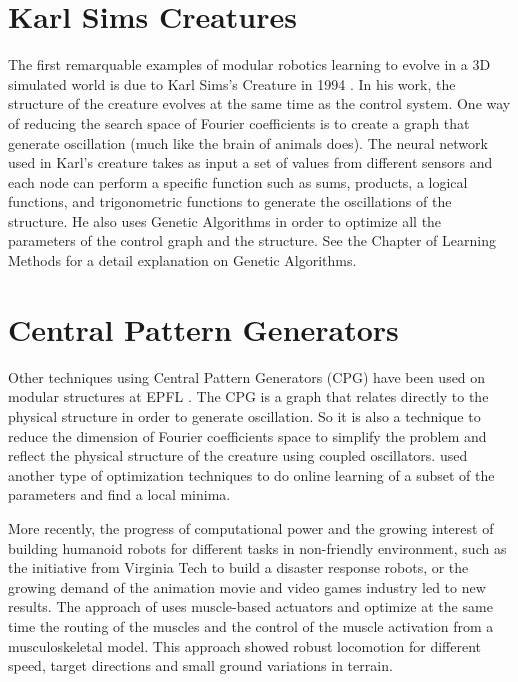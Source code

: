 \section{Karl Sims Creatures}
The first remarquable examples of modular robotics learning to evolve in a 3D simulated world is due to Karl Sims's Creature in 1994 \cite{karl}. In his work, the structure of the creature evolves at the same time as the control system. One way of reducing the search space of Fourier coefficients is to create a graph that generate oscillation (much like the brain of animals does). The neural network used in Karl's creature takes as input a set of values from different sensors and each node can perform a specific function such as sums, products, a logical functions, and trigonometric functions to generate the oscillations of the structure. He also uses Genetic Algorithms in order to optimize all the parameters of the control graph and the structure. See the Chapter of Learning Methods for a detail explanation on Genetic Algorithms. 

\section{Central Pattern Generators}
Other techniques using Central Pattern Generators (CPG) have been used on modular structures at EPFL \cite{marbach} \cite{sproewitz}. The CPG is a graph that relates directly to the physical structure in order to generate oscillation. So it is also a technique to reduce the dimension of Fourier coefficients space to simplify the problem and reflect the physical structure of the creature using coupled oscillators. \cite{marbach} used another type of optimization techniques to do online learning of a subset of the parameters and find a local minima.

More recently, the progress of computational power and the growing interest of building humanoid robots for different tasks in non-friendly environment, such as the initiative from Virginia Tech to build a disaster response robots, or the growing demand of the animation movie and video games industry led to new results. The approach of \cite{MuscleBasedBipeds} uses muscle-based actuators and optimize at the same time the routing of the muscles and the control of the muscle activation from a musculoskeletal model. This approach showed robust locomotion for different speed, target directions and small ground variations in terrain.


